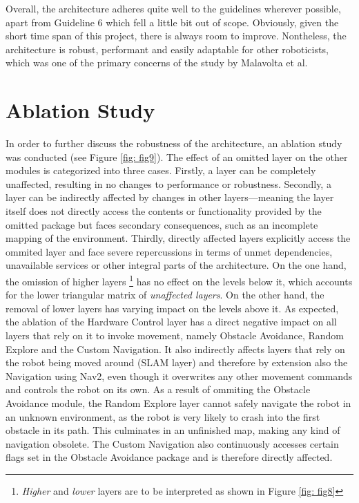 \documentclass[]{article}
\begin{document}
	Overall, the architecture adheres quite well to the guidelines wherever possible, apart from
	Guideline 6 which fell a little bit out of scope. Obviously, given the short time span of this project, there is always room to improve. Nontheless, the architecture is robust, performant and easily adaptable for other roboticists, which was one of the primary concerns of the study by Malavolta et al.
	
	\newpage
	
	\section{Ablation Study}  
	In order to further discuss the robustness of the architecture, an ablation study was conducted (see Figure \ref{fig: fig9}). The effect of an omitted layer on the other modules is categorized into three cases. Firstly, a layer can be completely unaffected, resulting in no changes to performance or robustness. Secondly, a layer can be indirectly affected by changes in other layers—meaning the layer itself does not directly access the contents or functionality provided by the omitted package but faces secondary consequences, such as an incomplete mapping of the environment. Thirdly, directly affected layers explicitly access the ommited layer and face severe repercussions in terms of unmet dependencies, unavailable services or other integral parts of the architecture. On the one hand, the omission of higher layers \footnote{\textit{Higher} and \textit{lower} layers are to be interpreted as shown in Figure \ref{fig: fig8}} has no effect on the levels below it, which accounts for the lower triangular matrix of \textit{unaffected layers}. On the other hand, the removal of lower layers has varying impact on the levels above it. \newline 
	As expected, the ablation of the Hardware Control layer has a direct negative impact on all layers that rely on it to invoke movement, namely Obstacle Avoidance, Random Explore and the Custom Navigation. It also indirectly affects layers that rely on the robot being moved around (SLAM layer) and therefore by extension also the Navigation using Nav2, even though it overwrites any other movement commands and controls the robot on its own. \newline
	As a result of ommiting the Obstacle Avoidance module, the Random Explore layer cannot safely navigate the robot in an unknown environment, as the robot is very likely to crash into the first obstacle in its path. This culminates in an unfinished map, making any kind of navigation obsolete. The Custom Navigation also continuously accesses certain flags set in the Obstacle Avoidance package and is therefore directly affected. \newline
\end{document}
